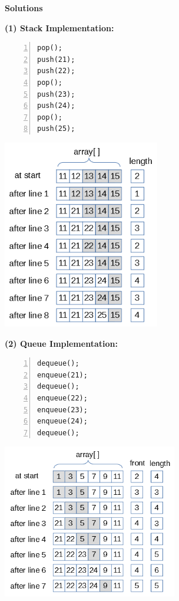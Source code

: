 \documentclass[a4paper,12pt]{article}
\begin{document}
\newpage

{\bf \large Solutions}


\vspace{10pt}
{\bf (1) Stack Implementation:}


\begin{center}
\begin{minipage}{.8\columnwidth}
\begin{Verbatim}[frame=single,numbers=left]
pop();
push(21);
push(22);
pop();
push(23);
push(24);
pop();
push(25);
\end{Verbatim}
\end{minipage}
\end{center}

\begin{center}
\includegraphics[width=2.7in]{sample-stacks-queues/stack-solution.png}
\end{center}

\vspace{20pt}
{\bf (2) Queue Implementation:}


\begin{center}
\begin{minipage}{.8\columnwidth}
\begin{Verbatim}[frame=single,numbers=left]
dequeue(); 
enqueue(21);
dequeue(); 
enqueue(22);
enqueue(23);
enqueue(24);
dequeue();
\end{Verbatim}
\end{minipage}
\end{center}

\begin{center}
\includegraphics[width=3in]{sample-stacks-queues/queue-solution.png}
\end{center}
\end{document}
